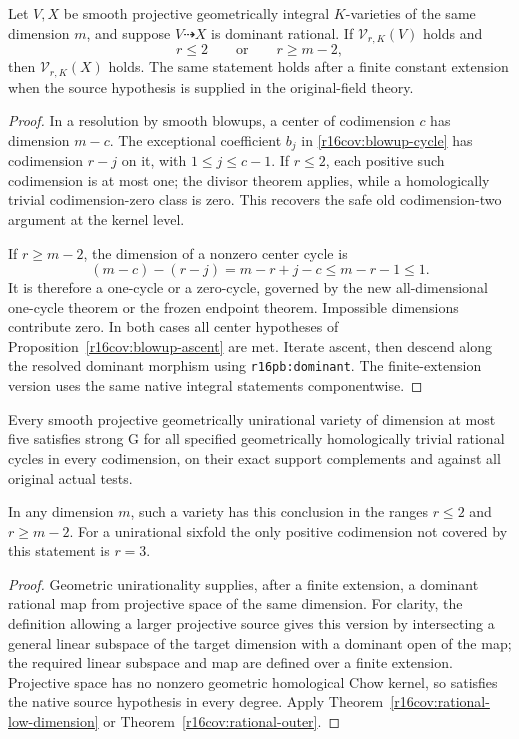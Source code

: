 \begin{theorem}
\label{r16cov:rational-outer}
Let $V,X$ be smooth projective geometrically integral $K$-varieties
of the same dimension $m$, and suppose $V\dashrightarrow X$ is
dominant rational.  If $\mathcal V_{r,K}(V)$ holds and
\[
                   r\leq2\qquad\text{or}\qquad r\geq m-2,
 \tag{CV16.7}\label{r16cov:outer-ranges}
\]
then $\mathcal V_{r,K}(X)$ holds.  The same statement holds after a
finite constant extension when the source hypothesis is supplied
in the original-field theory.
\end{theorem}

\begin{proof}
In a resolution by smooth blowups, a center of codimension $c$
has dimension $m-c$.  The exceptional coefficient $b_j$ in
\eqref{r16cov:blowup-cycle} has codimension $r-j$ on it, with
$1\leq j\leq c-1$.
If $r\leq2$, each positive such codimension is at most one;
the divisor theorem applies, while a homologically trivial
codimension-zero class is zero.  This recovers the safe old
codimension-two argument at the kernel level.

If $r\geq m-2$, the dimension of a nonzero center cycle is
\[
           (m-c)-(r-j)=m-r+j-c\leq m-r-1\leq1.
\]
It is therefore a one-cycle or a zero-cycle, governed by the
new all-dimensional one-cycle theorem or the frozen endpoint
theorem.  Impossible dimensions contribute zero.  In both cases
all center hypotheses of Proposition~\ref{r16cov:blowup-ascent}
are met.  Iterate ascent, then descend along the resolved dominant
morphism using \texttt{r16pb:dominant}.  The finite-extension
version uses the same native integral statements componentwise.
\end{proof}

\begin{corollary}
\label{r16cov:unirational}
Every smooth projective geometrically unirational variety of
dimension at most five satisfies strong G for all specified
geometrically homologically trivial rational cycles in every
codimension, on their exact support complements and against all
original actual tests.

In any dimension $m$, such a variety has this conclusion in the
ranges $r\leq2$ and $r\geq m-2$.  For a unirational sixfold the
only positive codimension not covered by this statement is $r=3$.
\end{corollary}

\begin{proof}
Geometric unirationality supplies, after a finite extension, a
dominant rational map from projective space of the same dimension.
For clarity, the definition allowing a larger projective source
gives this version by intersecting a general linear subspace of
the target dimension with a dominant open of the map; the required
linear subspace and map are defined over a finite extension.
Projective space has no nonzero geometric homological Chow kernel,
so satisfies the native source hypothesis in every degree.
Apply Theorem~\ref{r16cov:rational-low-dimension} or
Theorem~\ref{r16cov:rational-outer}.
\end{proof}

